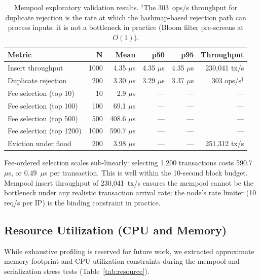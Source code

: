\documentclass[11pt,a4paper]{article}
\begin{document}
\begin{table}[h]
\centering
\small
\begin{tabular}{@{}lrrrrr@{}}
\toprule
\textbf{Metric} & \textbf{N} & \textbf{Mean} & \textbf{p50} & \textbf{p95} & \textbf{Throughput} \\
\midrule
Insert throughput   & 1000 & 4.35 $\mu$s & 4.35 $\mu$s & 4.35 $\mu$s & 230,041 tx/s \\
Duplicate rejection & 200  & 3.30 $\mu$s & 3.29 $\mu$s & 3.37 $\mu$s & 303 ops/s$^\dagger$ \\
Fee selection (top 10)   & 10   & 2.9 $\mu$s  & --- & --- & --- \\
Fee selection (top 100)  & 100  & 69.1 $\mu$s & --- & --- & --- \\
Fee selection (top 500)  & 500  & 408.6 $\mu$s & --- & --- & --- \\
Fee selection (top 1200) & 1000 & 590.7 $\mu$s & --- & --- & --- \\
Eviction under flood  & 200 & 3.98 $\mu$s & --- & --- & 251,312 tx/s \\
\bottomrule
\end{tabular}
\caption{Mempool exploratory validation results. $^\dagger$The 303~ops/s throughput for
duplicate rejection is the rate at which the hashmap-based rejection path
can process inputs; it is not a bottleneck in practice (Bloom filter
pre-screens at $O(1)$).}
\label{tab:mempool}
\end{table}

Fee-ordered selection scales sub-linearly: selecting 1,200 transactions costs
590.7~$\mu$s, or 0.49~$\mu$s per transaction. This is well within the
10-second block budget. Mempool insert throughput of 230,041~tx/s ensures the
mempool cannot be the bottleneck under any realistic transaction arrival rate;
the node's rate limiter (10 req/s per IP) is the binding constraint in
practice.

\subsection{Resource Utilization (CPU and Memory)}

While exhaustive profiling is reserved for future work, we extracted approximate memory footprint and CPU utilization constraints during the mempool and serialization stress tests (Table~\ref{tab:resource}).
\end{document}
